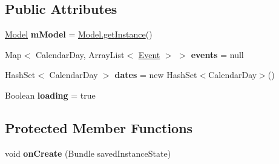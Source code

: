 \subsection*{Public Attributes}
\begin{DoxyCompactItemize}
\item 
\mbox{\label{classit_1_1diegocastagna_1_1ifermi_1_1activity_1_1_agenda_activity_a7cfb528cce7cd6cc51be1903e31b145f}} 
\mbox{\hyperlink{classit_1_1diegocastagna_1_1ifermi_1_1models_1_1_model}{Model}} {\bfseries m\+Model} = \mbox{\hyperlink{classit_1_1diegocastagna_1_1ifermi_1_1models_1_1_model_a467c28bc69afc493d5bb97a39bea3cbf}{Model.\+get\+Instance}}()
\item 
\mbox{\label{classit_1_1diegocastagna_1_1ifermi_1_1activity_1_1_agenda_activity_a1b19525b3340b5ad1fade85833b59a46}} 
Map$<$ Calendar\+Day, Array\+List$<$ \mbox{\hyperlink{classit_1_1diegocastagna_1_1ifermi_1_1utils_1_1_event}{Event}} $>$ $>$ {\bfseries events} = null
\item 
\mbox{\label{classit_1_1diegocastagna_1_1ifermi_1_1activity_1_1_agenda_activity_a1be0799ce85e34089f6f65174e9c23a7}} 
Hash\+Set$<$ Calendar\+Day $>$ {\bfseries dates} = new Hash\+Set$<$Calendar\+Day$>$()
\item 
\mbox{\label{classit_1_1diegocastagna_1_1ifermi_1_1activity_1_1_agenda_activity_a379bbfbc66be67f6740ec3deca995e5a}} 
Boolean {\bfseries loading} = true
\end{DoxyCompactItemize}
\subsection*{Protected Member Functions}
\begin{DoxyCompactItemize}
\item 
\mbox{\label{classit_1_1diegocastagna_1_1ifermi_1_1activity_1_1_agenda_activity_a0ae60399622ecdcf74b3758aa29882d3}} 
void {\bfseries on\+Create} (Bundle saved\+Instance\+State)
\end{DoxyCompactItemize}


